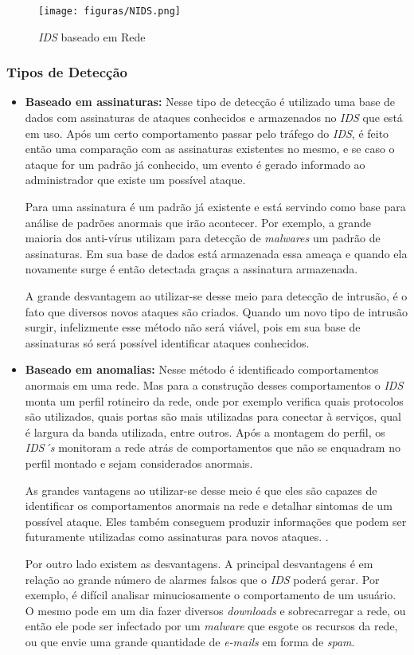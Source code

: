 \begin{figure}[!h]
\centering
\texttt{[image: figuras/NIDS.png]}
\caption{\textit{IDS} baseado em Rede} 	
\end{figure}

\subsubsection{Tipos de Detecção}
\begin{itemize}
\item \textbf{Baseado em assinaturas:} Nesse tipo de detecção é utilizado uma base de dados com assinaturas de ataques conhecidos e armazenados no \textit{IDS} que está em uso. Após um certo comportamento passar pelo tráfego do \textit{IDS}, é feito então uma comparação com as assinaturas existentes no mesmo, e se caso o ataque for um padrão já conhecido, um evento é gerado informado ao administrador que existe um possível ataque.

Para  uma assinatura é um padrão já existente e está servindo como base para análise de padrões anormais que irão acontecer. Por exemplo, a grande maioria dos anti-vírus utilizam para detecção de \textit{malwares} um padrão de assinaturas. Em sua base de dados está armazenada essa ameaça e quando ela novamente surge é então detectada graças a assinatura armazenada.

A grande desvantagem ao utilizar-se desse meio para detecção de intrusão, é o fato que diversos novos ataques são criados. Quando um novo tipo de intrusão surgir, infelizmente esse método não será viável, pois em sua base de assinaturas só será possível identificar ataques conhecidos.

\item \textbf{Baseado em anomalias:} Nesse método é identificado comportamentos anormais em uma rede. Mas para a construção desses comportamentos o \textit{IDS} monta um perfil rotineiro da rede, onde por exemplo verifica quais protocolos são utilizados, quais portas são mais utilizadas para conectar à serviços, qual é largura da banda utilizada, entre outros. Após a montagem do perfil, os \textit{IDS´s} monitoram a rede atrás de comportamentos que não se enquadram no perfil montado e sejam considerados anormais. 

As grandes vantagens ao utilizar-se desse meio é que eles são capazes de identificar os comportamentos anormais na rede e detalhar sintomas de um possível ataque. Eles também conseguem produzir informações que podem ser futuramente utilizadas como assinaturas para novos ataques. \cite{marcelo2003}.

Por outro lado existem as desvantagens. A principal desvantagens é em relação ao grande número de alarmes falsos que o \textit{IDS} poderá gerar. Por exemplo, é difícil analisar minuciosamente o comportamento de um usuário. O mesmo pode em um dia fazer diversos \textit{downloads} e sobrecarregar a rede, ou então ele pode ser infectado por um \textit{malware} que esgote os recursos da rede, ou que envie uma grande quantidade de \textit{e-mails} em forma de \textit{spam}.
\end{itemize}

